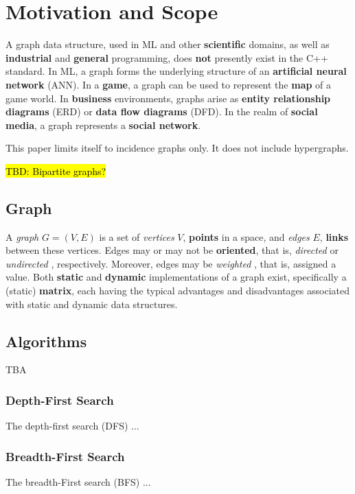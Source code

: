 \documentclass[10pt,onecolumn]{article}
\begin{document}
\section{Motivation and Scope}
A graph data structure, used in ML and other \textbf{scientific} domains, as well as \textbf{industrial} and \textbf{general} programming, does \textbf{not} presently exist in the C++ standard. In ML, a graph forms the underlying structure of an \textbf{artificial neural network} (ANN). In a \textbf{game}, a graph can be used to
represent the \textbf{map} of a game world. In \textbf{business} environments, graphs arise as \textbf{entity relationship diagrams} (ERD) or \textbf{data flow diagrams} (DFD). In the realm of \textbf{social media}, a graph represents a \textbf{social network}.

This paper limits itself to incidence graphs only. It does not include hypergraphs.

\hl{TBD: Bipartite graphs?}

\subsection{Graph}
 A \textit{graph} \cite{REF_graph} $G = (V, E)$ is a set of \textit{vertices} \cite{REF_graph} $V$, \textbf{points} in a space, and \textit{edges} \cite{REF_graph} $E$, \textbf{links} between these vertices. Edges may or may not be \textbf{oriented}, that is, \textit{directed} \cite{REF_graph} or \textit{undirected} \cite{REF_graph}, respectively. Moreover, edges may be \textit{weighted} \cite{REF_graph}, that is, assigned a value. Both \textbf{static} and \textbf{dynamic} implementations of a graph exist, specifically a (static) \textbf{matrix}, each having the typical advantages and disadvantages associated with static and dynamic data structures.

\subsection{Algorithms}
TBA

\subsubsection{Depth-First Search}
The depth-first search \cite{REF_graph} (DFS) ...

\subsubsection{Breadth-First Search}
The breadth-First search \cite{REF_graph} (BFS) ...
\end{document}
